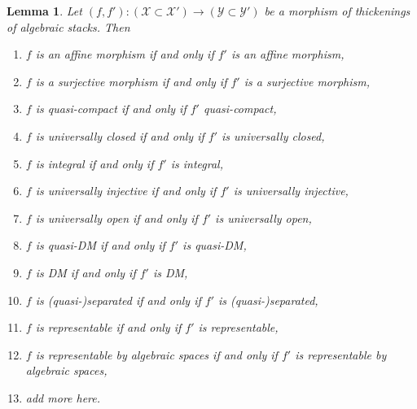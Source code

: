 \documentclass{stacks-project}
\theoremstyle{plain}
\newtheorem{lemma}[subsection]{Lemma}
\theoremstyle{definition}
\theoremstyle{remark}
\numberwithin{equation}{subsection}
\begin{document}
\begin{lemma}
\label{lemma-thicken-property-morphisms}
Let $(f, f') : (\mathcal{X} \subset \mathcal{X}') \to
(\mathcal{Y} \subset \mathcal{Y}')$
be a morphism of thickenings of algebraic stacks. Then
\begin{enumerate}
\item $f$ is an affine morphism if and only if $f'$ is an affine morphism,
\item $f$ is a surjective morphism if and only if $f'$ is a surjective morphism,
\item $f$ is quasi-compact if and only if $f'$ quasi-compact,
\item $f$ is universally closed if and only if $f'$ is universally closed,
\item $f$ is integral if and only if $f'$ is integral,
\item $f$ is universally injective if and only if $f'$ is universally injective,
\item $f$ is universally open if and only if $f'$ is universally open,
\item $f$ is quasi-DM if and only if $f'$ is quasi-DM,
\item $f$ is DM if and only if $f'$ is DM,
\item $f$ is (quasi-)separated if and only if $f'$ is (quasi-)separated,
\item $f$ is representable if and only if $f'$ is representable,
\item $f$ is representable by algebraic spaces if and only if $f'$ is
representable by algebraic spaces,
\item add more here.
\end{enumerate}
\end{lemma}
\end{document}
